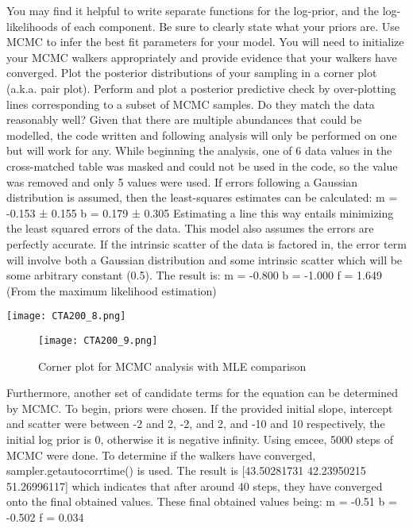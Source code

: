 \documentclass{article}
\begin{document}
You may find it helpful to write separate functions for the log-prior, and the log-likelihoods of each component. Be sure to clearly state what your priors are.
Use MCMC to infer the best fit parameters for your model. You will need to initialize your MCMC walkers appropriately and provide evidence that your walkers have converged. Plot the posterior distributions of your sampling in a corner plot (a.k.a. pair plot). Perform and plot a posterior predictive check by over-plotting lines corresponding to a subset of MCMC samples. Do they match the data reasonably well?
\newline\hline
\bigskip\noindent
Given that there are multiple abundances that could be modelled, the code written and following analysis will only be performed on one but will work for any. While beginning the analysis, one of 6 data values in the cross-matched table was masked and could not be used in the code, so the value was removed and only 5 values were used.
If errors following a Gaussian distribution is assumed, then the least-squares estimates can be calculated:
\newline m = -0.153 ± 0.155
\newline b = 0.179 ± 0.305
\newline Estimating a line this way entails minimizing the least squared errors of the data. This model also assumes the errors are perfectly accurate. If the intrinsic scatter of the data is factored in, the error term will involve both a Gaussian distribution and some intrinsic scatter which will be some arbitrary constant (0.5). The result is:
\newline m = -0.800
\newline b = -1.000
\newline f = 1.649
\newline (From the maximum likelihood estimation)

\texttt{[image: CTA200\_8.png]}
\bigskip\noindent

\begin{wrapfigure}{r}{0.5\textwidth}
  \centering
  \texttt{[image: CTA200\_9.png]}
  \caption{Corner plot for MCMC analysis with MLE comparison}
\end{wrapfigure}

Furthermore, another set of candidate terms for the equation can be determined by MCMC. To begin, priors were chosen. If the provided initial slope, intercept and scatter were between -2 and 2, -2, and 2, and -10 and 10 respectively, the initial log prior is 0, otherwise it is negative infinity. Using emcee, 5000 steps of MCMC were done. To determine if the walkers have converged, sampler.get\textunderscore autocorr\textunderscore time() is used. The result is [43.50281731 42.23950215 51.26996117] which indicates that after around 40 steps, they have converged onto the final obtained values. These final obtained values being:
\newline m = -0.51
\newline b = -0.502
\newline f = 0.034 
\end{document}
